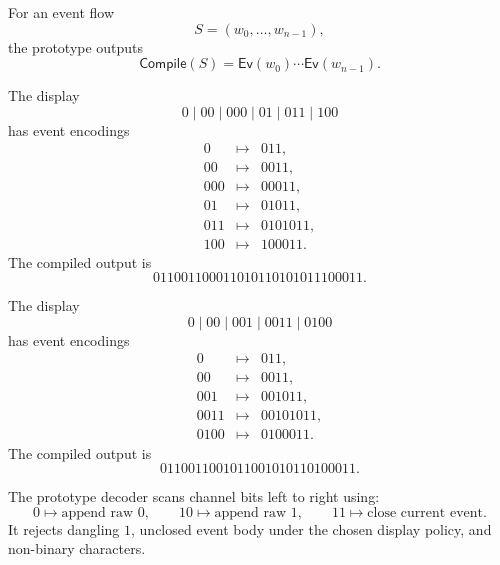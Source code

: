 \begin{definition}
\label{def:minimal-prototype-flow-encoder}
For an event flow
$$
  S=(w_0,\ldots,w_{n-1}),
$$
the prototype outputs
$$
  \mathsf{Compile}(S)=\mathsf{Ev}(w_0)\cdots\mathsf{Ev}(w_{n-1}).
$$
\end{definition}

\begin{example}
\label{ex:minimal-prototype-completion-encoding}
The display
$$
  0\mid 00\mid 000\mid 01\mid 011\mid 100
$$
has event encodings
$$
\begin{array}{rcl}
  0    &\mapsto& 011,\\
  00   &\mapsto& 0011,\\
  000  &\mapsto& 00011,\\
  01   &\mapsto& 01011,\\
  011  &\mapsto& 0101011,\\
  100  &\mapsto& 100011.
\end{array}
$$
The compiled output is
$$
  011001100011010110101011100011.
$$
\end{example}

\begin{example}
\label{ex:minimal-prototype-add-fold-encoding}
The display
$$
  0\mid 00\mid 001\mid 0011\mid 0100
$$
has event encodings
$$
\begin{array}{rcl}
  0     &\mapsto& 011,\\
  00    &\mapsto& 0011,\\
  001   &\mapsto& 001011,\\
  0011  &\mapsto& 00101011,\\
  0100  &\mapsto& 0100011.
\end{array}
$$
The compiled output is
$$
  0110011001011001010110100011.
$$
\end{example}

\begin{definition}
\label{def:minimal-prototype-stream-decoder}
The prototype decoder scans channel bits left to right using:
$$
  0\mapsto \text{append raw }0,
  \qquad
  10\mapsto \text{append raw }1,
  \qquad
  11\mapsto \text{close current event}.
$$
It rejects dangling $1$, unclosed event body under the chosen display policy, and non-binary characters.
\end{definition}

